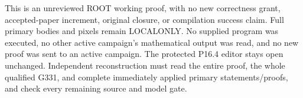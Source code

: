 \documentclass[11pt]{article}
\begin{document}
This is an unreviewed ROOT working proof, with no new correctness grant,
accepted-paper increment, original closure, or compilation success claim.
Full primary bodies and pixels remain LOCALONLY. No supplied program was
executed, no other active campaign's mathematical output was read, and no
new proof was sent to an active campaign. The protected P16.4 editor stays
open unchanged. Independent reconstruction must read the entire proof,
the whole qualified G331, and complete immediately applied primary
statements/proofs, and check every remaining source and model gate.
\end{document}

